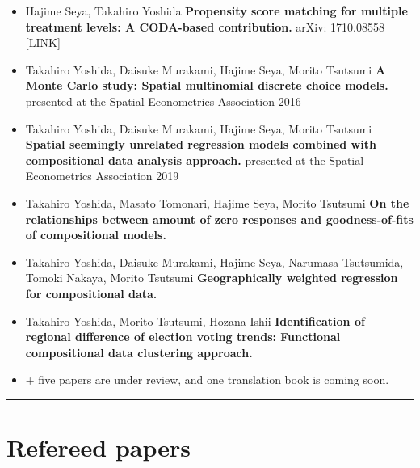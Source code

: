 \documentclass[]{book}
\begin{document}
\begin{itemize}
\item
  Hajime Seya, Takahiro Yoshida
  \textbf{Propensity score matching for multiple treatment levels: A CODA-based contribution.}
  arXiv: 1710.08558 {[}\href{https://arxiv.org/abs/1710.08558}{LINK}{]}
\item
  Takahiro Yoshida, Daisuke Murakami, Hajime Seya, Morito Tsutsumi
  \textbf{A Monte Carlo study: Spatial multinomial discrete choice models.}
  presented at the Spatial Econometrics Association 2016
\item
  Takahiro Yoshida, Daisuke Murakami, Hajime Seya, Morito Tsutsumi
  \textbf{Spatial seemingly unrelated regression models combined with compositional data analysis approach.}
  presented at the Spatial Econometrics Association 2019
\item
  Takahiro Yoshida, Masato Tomonari, Hajime Seya, Morito Tsutsumi
  \textbf{On the relationships between amount of zero responses and goodness-of-fits of compositional models.}
\item
  Takahiro Yoshida, Daisuke Murakami, Hajime Seya, Narumasa Tsutsumida, Tomoki Nakaya, Morito Tsutsumi
  \textbf{Geographically weighted regression for compositional data.}
\item
  Takahiro Yoshida, Morito Tsutsumi, Hozana Ishii
  \textbf{Identification of regional difference of election voting trends: Functional compositional data clustering approach.}
\item
  + five papers are under review, and one translation book is coming soon.
\end{itemize}

\begin{center}\rule{0.5\linewidth}{\linethickness}\end{center}

\hypertarget{refereed-papers}{%
\section*{Refereed papers}\label{refereed-papers}}
\end{document}
